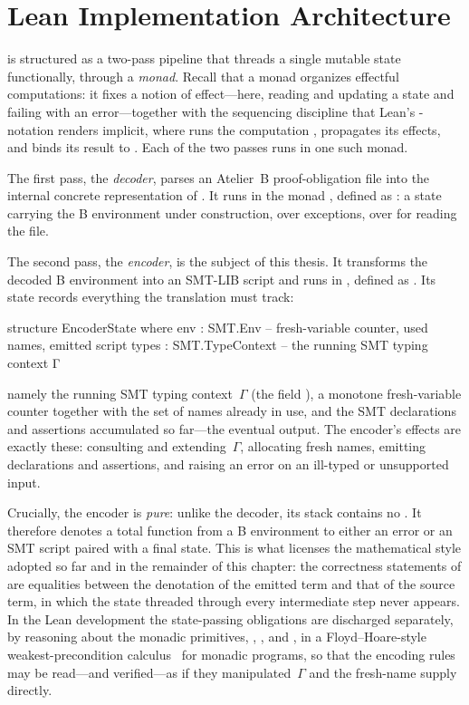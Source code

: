 \section{Lean Implementation Architecture}
\label{sec:lean-implementation-architecture}

\beer{} is structured as a two-pass pipeline that threads a single mutable state
functionally, through a \emph{monad}. Recall that a monad organizes effectful
computations: it fixes a notion of effect---here, reading and updating a state and
failing with an error---together with the sequencing discipline that Lean's
-notation renders implicit, where  runs the
computation , propagates its effects, and binds its result to
. Each of the two passes runs in one such monad.

The first pass, the \emph{decoder}, parses an Atelier~B proof-obligation file 
into the internal concrete representation of . It
runs in the monad {\small{}}, defined as
: a state carrying the B
environment under construction, over exceptions, over  for reading the
file.

The second pass, the \emph{encoder}, is the subject of this thesis. It transforms
the decoded B environment into an SMT-LIB script and runs in
{\small{}}, defined as
. Its state records everything the
translation must track:
\begin{leanlisting}
structure EncoderState where
  env   : SMT.Env          -- fresh-variable counter, used names, emitted script
  types : SMT.TypeContext  -- the running SMT typing context Γ
\end{leanlisting}
namely the running SMT typing context~$\Gamma$ (the field ), a
monotone fresh-variable counter together with the set of names already in use, and
the SMT declarations and assertions accumulated so far---the eventual output.
The encoder's effects are exactly these: consulting and
extending~$\Gamma$, allocating fresh names, emitting declarations and assertions,
and raising an error on an ill-typed or unsupported input.

Crucially, the encoder is \emph{pure}: unlike the decoder, its stack contains no
. It therefore denotes a total function from a B environment to either
an error or an SMT script paired with a final state. This is what licenses the
mathematical style adopted so far and in the remainder of this chapter: the correctness
statements of  are equalities between the
denotation of the emitted term and that of the source term, in which the state
threaded through every intermediate step never appears. In the Lean development the
state-passing obligations are discharged separately, by reasoning about the monadic
primitives, \eg {}, , and , in a
Floyd--Hoare-style~\cite{floyd1967meanings,hoare1969axiomatic} weakest-precondition
calculus~\cite{dijkstra1975guarded} for monadic programs, so that the encoding rules may
be read---and verified---as if they manipulated~$\Gamma$ and the fresh-name supply directly.

